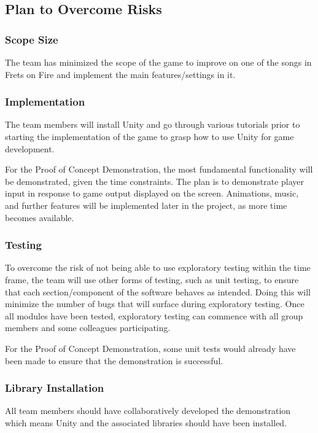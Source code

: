 \documentclass[12pt,letterpaper]{article}
\begin{document}
\subsection{Plan to Overcome Risks}

\subsubsection{Scope Size}
The team has minimized the scope of the game to improve on one of the songs in Frets on Fire and implement the main features/settings in it.

\subsubsection{Implementation}
The team members will install Unity and go through various tutorials prior to starting the implementation of the game to grasp how to use Unity for game development. 

For the Proof of Concept Demonstration, the most fundamental functionality will be demonstrated, given the time constraints. The plan is to demonstrate player input in response to game output displayed on the screen. Animations, music, and further features will be implemented later in the project, as more time becomes available.

\subsubsection{Testing}
To overcome the risk of not being able to use exploratory testing within the time frame, the team will use other forms of testing, such as unit testing, to ensure that each section/component of the software behaves as intended. Doing this will minimize the number of bugs that will surface during exploratory testing. Once all modules have been tested, exploratory testing can commence with all group members and some colleagues participating.

For the Proof of Concept Demonstration, some unit tests would already have been made to ensure that the demonstration is successful. 

\subsubsection{Library Installation}
All team members should have collaboratively developed the demonstration which means Unity and the associated libraries should have been installed.
\end{document}
